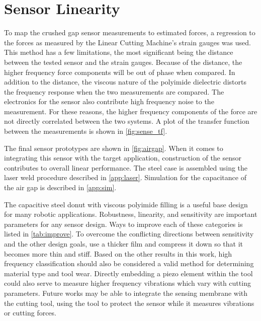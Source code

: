 \chapter{Sensor Linearity
\label{chap:10}}

To map the crushed gap sensor measurements to estimated forces, 
a regression to the forces as measured by the 
Linear Cutting Machine's strain gauges was used.
This method has a few limitations, the most significant
being the distance between the tested sensor and the strain gauges.
Because of the distance, the higher frequency force components will
be out of phase when compared. 
In addition to the distance, the viscous nature of the polyimide dielectric distorts the 
frequency response when the two measurements are compared.
The electronics for the sensor also contribute high frequency noise to the measurement.
For these reasons, the higher frequency components of the force are not directly correlated 
between the two systems. 
A plot of the transfer function between the measurements is shown in \ref{fig:sense_tf}.

The final sensor prototypes are shown in \ref{fig:airgap}.
When it comes to integrating this sensor with the target application,
construction of the sensor contributes to overall linear performance.
The steel case is assembled using the laser weld procedure described in \ref{app:laser}.
Simulation for the capacitance of the air gap is described in \ref{app:sim}.

The capacitive steel donut with viscous polyimide filling is a useful base design
for many robotic applications. Robustness, linearity, and sensitivity are important 
parameters for any sensor design. Ways to improve each of these categories is listed in \ref{tab:improve}.
To overcome the conflicting directions between sensitivity and the other design goals,
 use a thicker film and compress it down so that it becomes more thin and stiff.
Based on the other results in this work, high frequency classification 
should also be considered a valid method for
 determining material type and tool wear. 
Directly embedding a piezo element within the tool could
also serve to measure higher frequency vibrations which vary with cutting parameters.
Future works may be able to integrate the sensing membrane with the cutting tool,
using the tool to protect the sensor while it measures vibrations or cutting forces.


